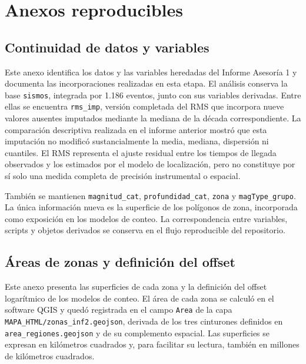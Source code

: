 \documentclass[
  spanish,
  letterpaper,
  DIV=11,
  numbers=noendperiod]{scrartcl}
\begin{document}
\endgroup
{}

\newpage

\section{Anexos reproducibles}\label{anexos-reproducibles}

\subsection{Continuidad de datos y
variables}\label{sec-anexo-continuidad}

Este anexo identifica los datos y las variables heredadas del Informe
Asesoría 1 y documenta las incorporaciones realizadas en esta etapa. El
análisis conserva la base \texttt{sismos}, integrada por 1.186 eventos,
junto con sus variables derivadas. Entre ellas se encuentra
\texttt{rms\_imp}, versión completada del RMS que incorpora nueve
valores ausentes imputados mediante la mediana de la década
correspondiente. La comparación descriptiva realizada en el informe
anterior mostró que esta imputación no modificó sustancialmente la
media, mediana, dispersión ni cuantiles. El RMS representa el ajuste
residual entre los tiempos de llegada observados y los estimados por el
modelo de localización, pero no constituye por sí solo una medida
completa de precisión instrumental o espacial.

También se mantienen \texttt{magnitud\_cat}, \texttt{profundidad\_cat},
\texttt{zona} y \texttt{magType\_grupo}. La única información nueva es
la superficie de los polígonos de zona, incorporada como exposición en
los modelos de conteo. La correspondencia entre variables, scripts y
objetos derivados se conserva en el flujo reproducible del repositorio.

\subsection{Áreas de zonas y definición del
offset}\label{sec-anexo-areas}

Este anexo presenta las superficies de cada zona y la definición del
offset logarítmico de los modelos de conteo. El área de cada zona se
calculó en el software QGIS y quedó registrada en el campo \texttt{Area}
de la capa \texttt{MAPA\_HTML/zonas\_inf2.geojson}, derivada de los tres
cinturones definidos en \texttt{area\_regiones.geojson} y de su
complemento espacial. Las superficies se expresan en kilómetros
cuadrados y, para facilitar su lectura, también en millones de
kilómetros cuadrados.
\end{document}
